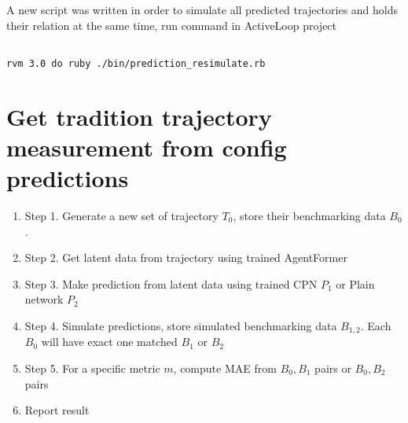 \documentclass{report}
\begin{document}
A new script was written in order to simulate all predicted trajectories and 
holds their relation at the same time, run command in ActiveLoop project

\begin{verbatim}

rvm 3.0 do ruby ./bin/prediction_resimulate.rb

\end{verbatim}

\section{Get tradition trajectory measurement from config predictions}
\begin{enumerate}
  \item Step 1. Generate a new set of trajectory $T_0$, store their 
    benchmarking data $B_0$.
  \item Step 2. Get latent data from trajectory using trained AgentFormer
  \item Step 3. Make prediction from latent data using trained CPN $P_1$ or 
    Plain network $P_2$
  \item Step 4. Simulate predictions, store simulated benchmarking data $B_{1, 
    2}$. Each $B_0$ will have exact one matched $B_1$ or $B_2$
  \item Step 5. For a specific metric $m$, compute MAE from $B_0, B_1$ pairs or 
    $B_0, B_2$ pairs
  \item Report result
\end{enumerate}




\printbibliography
\end{document}
